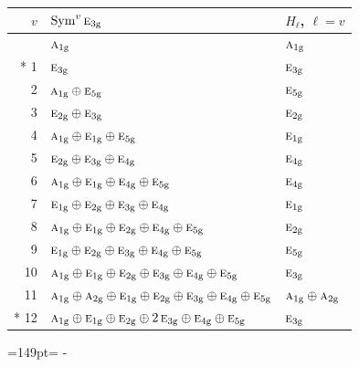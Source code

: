\documentclass[10pt,a4paper]{article}
\newcommand{\needspace}[1]{\par\penalty-100\begingroup\dimen0=#1\relax\dimen2=\pagegoal
  \advance\dimen2-\pagetotal\ifdim\dimen0>\dimen2\relax\ifdim\dimen2>0pt\vfil\break\fi\fi
  \endgroup}
\numberwithin{equation}{section}
\newcommand{\irr}[1]{\text{\normalfont\scshape #1}}
\newcommand{\ptag}[1]{\mathrm{#1}}
\begin{document}
{\small\begin{longtable}{@{}rll@{}}\toprule
$v$ & $\operatorname{Sym}^{v}\irr{e}_{3\ptag{g}}$ & $H_\ell$, $\ell = v$\\\midrule\endhead
\bottomrule\endfoot\endlastfoot
0 & $\irr{a}_{1\ptag{g}}$ & $\irr{a}_{1\ptag{g}}$\\*
1 & $\irr{e}_{3\ptag{g}}$ & $\irr{e}_{3\ptag{g}}$\\
2 & $\irr{a}_{1\ptag{g}} \oplus \irr{e}_{5\ptag{g}}$ & $\irr{e}_{5\ptag{g}}$\\
3 & $\irr{e}_{2\ptag{g}} \oplus \irr{e}_{3\ptag{g}}$ & $\irr{e}_{2\ptag{g}}$\\
4 & $\irr{a}_{1\ptag{g}} \oplus \irr{e}_{1\ptag{g}} \oplus \irr{e}_{5\ptag{g}}$ & $\irr{e}_{1\ptag{g}}$\\
5 & $\irr{e}_{2\ptag{g}} \oplus \irr{e}_{3\ptag{g}} \oplus \irr{e}_{4\ptag{g}}$ & $\irr{e}_{4\ptag{g}}$\\
6 & $\irr{a}_{1\ptag{g}} \oplus \irr{e}_{1\ptag{g}} \oplus \irr{e}_{4\ptag{g}} \oplus \irr{e}_{5\ptag{g}}$ & $\irr{e}_{4\ptag{g}}$\\
7 & $\irr{e}_{1\ptag{g}} \oplus \irr{e}_{2\ptag{g}} \oplus \irr{e}_{3\ptag{g}} \oplus \irr{e}_{4\ptag{g}}$ & $\irr{e}_{1\ptag{g}}$\\
8 & $\irr{a}_{1\ptag{g}} \oplus \irr{e}_{1\ptag{g}} \oplus \irr{e}_{2\ptag{g}} \oplus \irr{e}_{4\ptag{g}} \oplus \irr{e}_{5\ptag{g}}$ & $\irr{e}_{2\ptag{g}}$\\
9 & $\irr{e}_{1\ptag{g}} \oplus \irr{e}_{2\ptag{g}} \oplus \irr{e}_{3\ptag{g}} \oplus \irr{e}_{4\ptag{g}} \oplus \irr{e}_{5\ptag{g}}$ & $\irr{e}_{5\ptag{g}}$\\
10 & $\irr{a}_{1\ptag{g}} \oplus \irr{e}_{1\ptag{g}} \oplus \irr{e}_{2\ptag{g}} \oplus \irr{e}_{3\ptag{g}} \oplus \irr{e}_{4\ptag{g}} \oplus \irr{e}_{5\ptag{g}}$ & $\irr{e}_{3\ptag{g}}$\\
11 & $\irr{a}_{1\ptag{g}} \oplus \irr{a}_{2\ptag{g}} \oplus \irr{e}_{1\ptag{g}} \oplus \irr{e}_{2\ptag{g}} \oplus \irr{e}_{3\ptag{g}} \oplus \irr{e}_{4\ptag{g}} \oplus \irr{e}_{5\ptag{g}}$ & $\irr{a}_{1\ptag{g}} \oplus \irr{a}_{2\ptag{g}}$\\*
12 & $\irr{a}_{1\ptag{g}} \oplus \irr{e}_{1\ptag{g}} \oplus \irr{e}_{2\ptag{g}} \oplus 2\,\irr{e}_{3\ptag{g}} \oplus \irr{e}_{4\ptag{g}} \oplus \irr{e}_{5\ptag{g}}$ & $\irr{e}_{3\ptag{g}}$\\
\bottomrule\end{longtable}}
\needspace{149pt}
\end{document}
